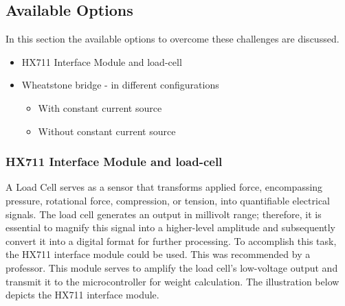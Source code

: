 \documentclass[../report.tex]{subfiles}
\begin{document}
\subsection{Available Options}

In this section the available options to overcome these challenges are discussed.

\begin{itemize}
  
  \item HX711 Interface Module and load-cell
  \item Wheatstone bridge - in different configurations
  \begin{itemize}
    \item With constant current source
    \item Without constant current source
  \end{itemize}
  
\end{itemize}

\subsubsection{HX711 Interface Module and load-cell}

A Load Cell serves as a sensor that transforms applied force, encompassing pressure, rotational force, compression, or tension, into quantifiable electrical signals.
The load cell generates an output in millivolt range; therefore, it is essential to magnify this signal into a higher-level amplitude and subsequently convert it into a digital format for further processing.
To accomplish this task, the HX711 interface module could be used. This was recommended by a professor. This module serves to amplify the load cell's low-voltage output and transmit it to the microcontroller for weight calculation. 
The illustration below depicts the HX711 interface module.
\end{document}
